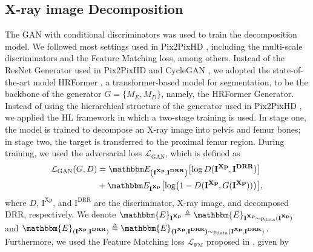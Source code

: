 \documentclass[times,twocolumn,final]{elsarticle}
\begin{document}
{\subsection{X-ray image Decomposition}
\newcommand{\image}[1]{\bm{\mathrm{#1}}}
\newcommand{\imgxray}{\image{I^{Xp}}}
\newcommand{\imgdrr}{\image{I^{DRR}}}
\newcommand{\Exraydrr}{\mathbbm E_{\left(\imgxray,\imgdrr\right)}}
\newcommand{\Exray}{\mathbbm E_{\imgxray}}
\newcommand{\imgxrayi}{\image{I}^{\image{Xp}}_i}
\newcommand{\imgdrri}{\image{I}^{\image{DRR}}_i}
The GAN with conditional discriminators was used to train the decomposition model. 
We followed most settings used in Pix2PixHD \citep{wang_high-resolution_2018}, including the multi-scale discriminators and the Feature Matching loss, among others. 
Instead of the ResNet Generator used in Pix2PixHD \citep{wang_high-resolution_2018} and CycleGAN \citep{zhu_unpaired_2017}, we adopted the state-of-the-art model HRFormer \citep{yuan_hrformer_2021}, a transformer-based model for segmentation, to be the backbone of the generator $G=\{M_E,M_D\}$, namely, the HRFormer Generator. 
Instead of using the hierarchical structure of the generator used in Pix2PixHD \citep{wang_high-resolution_2018}, we applied the HL framework in which a two-stage training is used. 
In stage one, the model is trained to decompose an X-ray image into pelvis and femur bones; in stage two, the target is transferred to the proximal femur region. 
During training, we used the adversarial loss $\mathcal{L}_{\mathrm{GAN}}$, which is defined as
\begin{equation}
\begin{split}
    \mathcal{L}_{\mathrm{GAN}}(G,D)
    & =\Exraydrr\bigl[\log D(\imgxray,\imgdrr)\bigr]\\
    & +\Exray\bigl[\log(1-D(\imgxray,G(\imgxray)))\bigr],
\end{split}
\label{eq:LGAN}
\end{equation}
where $D$, $\imgxray$, and $\imgdrr$ are the discriminator, X-ray image, and decomposed DRR, respectively.
We denote $\mathbbm{E}_{\bm{\mathrm{I^{Xp}}}}\triangleq\mathbbm{E}_{\bm{\mathrm{I^{Xp}}}\sim p_{\mathrm{data}}(\bm{\mathrm{I^{Xp}}})}$ and $\mathbbm{E}_{(\bm{\mathrm{I^{Xp}}},\bm{\mathrm{I^{DRR}}})}\triangleq\mathbbm{E}_{\bm{\mathrm{(I^{Xp}}},\bm{\mathrm{I^{DRR})}}\sim p_{\mathrm{data}}(\bm{\mathrm{I^{Xp}}},\bm{\mathrm{I^{DRR}}})}$. Furthermore, we used the Feature Matching loss $\mathcal{L}_{\mathrm{FM}}$ proposed in \citep{wang_high-resolution_2018}, given by
\begin{equation}

\end{equation}}
\end{document}
